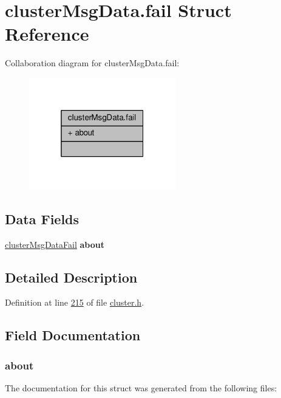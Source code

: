 \hypertarget{structclusterMsgData_8fail}{}\section{cluster\+Msg\+Data.\+fail Struct Reference}
\label{structclusterMsgData_8fail}


Collaboration diagram for cluster\+Msg\+Data.\+fail\+:\nopagebreak
\begin{figure}[H]
\begin{center}
\leavevmode
\includegraphics[width=181pt]{structclusterMsgData_8fail__coll__graph}
\end{center}
\end{figure}
\subsection*{Data Fields}
\begin{DoxyCompactItemize}
\item 
\mbox{\label{structclusterMsgData_8fail_a46b3931b9959c927df4fc65fdee94b07}} 
\hyperlink{structclusterMsgDataFail}{cluster\+Msg\+Data\+Fail} {\bfseries about}
\end{DoxyCompactItemize}


\subsection{Detailed Description}


Definition at line \hyperlink{cluster_8h_source_l00215}{215} of file \hyperlink{cluster_8h_source}{cluster.\+h}.



\subsection{Field Documentation}
\mbox{\label{structclusterMsgData_8fail_a46b3931b9959c927df4fc65fdee94b07}} 
\subsubsection{\texorpdfstring{about}{about}}
{\footnotesize\ttfamily }



The documentation for this struct was generated from the following files\+: